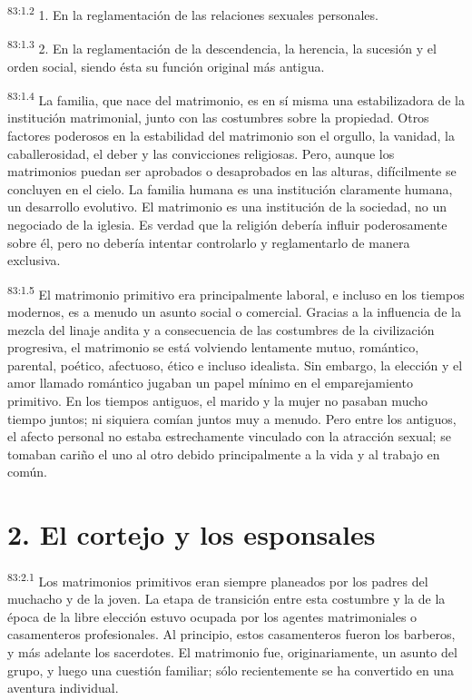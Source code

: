 \par
\textsuperscript{83:1.2} 1. En la reglamentación de las relaciones sexuales personales.

\par
\textsuperscript{83:1.3} 2. En la reglamentación de la descendencia, la herencia, la sucesión y el orden social, siendo ésta su función original más antigua.

\par
\textsuperscript{83:1.4} La familia, que nace del matrimonio, es en sí misma una estabilizadora de la institución matrimonial, junto con las costumbres sobre la propiedad. Otros factores poderosos en la estabilidad del matrimonio son el orgullo, la vanidad, la caballerosidad, el deber y las convicciones religiosas. Pero, aunque los matrimonios puedan ser aprobados o desaprobados en las alturas, difícilmente se concluyen en el cielo. La familia humana es una institución claramente humana, un desarrollo evolutivo. El matrimonio es una institución de la sociedad, no un negociado de la iglesia. Es verdad que la religión debería influir poderosamente sobre él, pero no debería intentar controlarlo y reglamentarlo de manera exclusiva.

\par
\textsuperscript{83:1.5} El matrimonio primitivo era principalmente laboral, e incluso en los tiempos modernos, es a menudo un asunto social o comercial. Gracias a la influencia de la mezcla del linaje andita y a consecuencia de las costumbres de la civilización progresiva, el matrimonio se está volviendo lentamente mutuo, romántico, parental, poético, afectuoso, ético e incluso idealista. Sin embargo, la elección y el amor llamado romántico jugaban un papel mínimo en el emparejamiento primitivo. En los tiempos antiguos, el marido y la mujer no pasaban mucho tiempo juntos; ni siquiera comían juntos muy a menudo. Pero entre los antiguos, el afecto personal no estaba estrechamente vinculado con la atracción sexual; se tomaban cariño el uno al otro debido principalmente a la vida y al trabajo en común.

\section*{2. El cortejo y los esponsales}
\par
\textsuperscript{83:2.1} Los matrimonios primitivos eran siempre planeados por los padres del muchacho y de la joven. La etapa de transición entre esta costumbre y la de la época de la libre elección estuvo ocupada por los agentes matrimoniales o casamenteros profesionales. Al principio, estos casamenteros fueron los barberos, y más adelante los sacerdotes. El matrimonio fue, originariamente, un asunto del grupo, y luego una cuestión familiar; sólo recientemente se ha convertido en una aventura individual.

